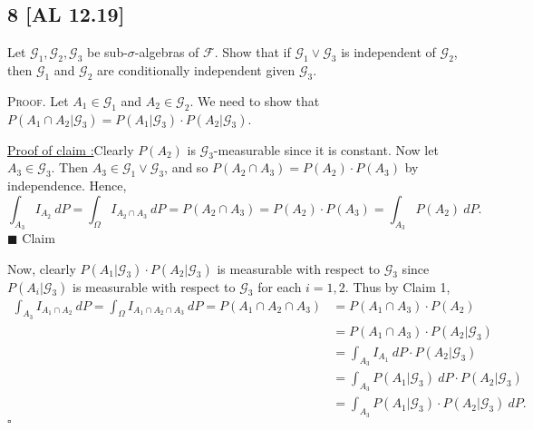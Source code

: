 \documentclass[12pt]{article}
\newcounter{ProofCounter}
\newcounter{ClaimCounter}[ProofCounter]
\newenvironment{Proof}{\stepcounter{ProofCounter}\textsc{Proof.}}{\hfill$\square$}
\newenvironment{claim}[1]{\vspace{1mm}\stepcounter{ClaimCounter}\par\noindent\underline{\bf Claim \theClaimCounter:}\space#1}{}
\newenvironment{claimproof}[1]{\par\noindent\underline{Proof of claim \theClaimCounter:}\space#1}{\hfill $\blacksquare$ Claim \theClaimCounter}
\begin{document}
\newpage
\subsection*{8 [AL 12.19]}
\begin{tcolorbox}
  Let $\mathcal{G}_1, \mathcal{G}_2, \mathcal{G}_3$ be sub-$\sigma$-algebras of $\mathcal{F}$. Show that if $\mathcal{G}_1 \vee \mathcal{G}_3$ is
  independent of $\mathcal{G}_2$, then $\mathcal{G}_1$ and $\mathcal{G}_2$ are conditionally independent given $\mathcal{G}_3$.
\end{tcolorbox}
\begin{Proof}
  Let $A_1 \in \mathcal{G}_1$ and $A_2 \in \mathcal{G}_2$. We need to show that $P(A_1 \cap A_2 | \mathcal{G}_3) = P(A_1 | \mathcal{G}_3) \cdot P(A_2 |
  \mathcal{G}_3)$.

  \begin{claimproof}
    Clearly $P(A_2)$ is $\mathcal{G}_3$-measurable since it is constant.
    Now let $A_3 \in \mathcal{G}_3$. Then $A_3 \in \mathcal{G}_1 \vee \mathcal{G}_3$, and so $P(A_2 \cap A_3) = P(A_2)\cdot P(A_3)$ by independence.
    Hence,
    \[ \int_{A_3}I_{A_2}\ dP = \int_{\Omega}I_{A_2 \cap A_3}\ dP = P(A_2 \cap A_3) = P(A_2)\cdot P(A_3) = \int_{A_3}P(A_2)\ dP. \]
  \end{claimproof}

  Now, clearly $P(A_1|\mathcal{G}_3)\cdot P(A_2|\mathcal{G}_3)$ is measurable with respect to $\mathcal{G}_3$ since $P(A_i | \mathcal{G}_3)$ is 
  measurable with respect to $\mathcal{G}_3$ for each $i = 1,2$. Thus by Claim 1,
  \begin{align*}
    \int_{A_3}I_{A_1\cap A_2}\ dP = \int_{\Omega}I_{A_1\cap A_2\cap A_3}\ dP = P(A_1 \cap A_2 \cap A_3) & = P(A_1\cap A_3)\cdot P(A_2)  \\
    & = P(A_1\cap A_3) \cdot P(A_2|\mathcal{G}_3) \\
    & = \int_{A_3}I_{A_1}\ dP \cdot P(A_2|\mathcal{G}_3) \\
    & = \int_{A_3}P(A_1|\mathcal{G}_3)\ dP \cdot P(A_2 | \mathcal{G}_3) \\
    & = \int_{A_3}P(A_1|\mathcal{G}_3)\cdot P(A_2|\mathcal{G}_3)\ dP.
  \end{align*}
\end{Proof}
\end{document}
